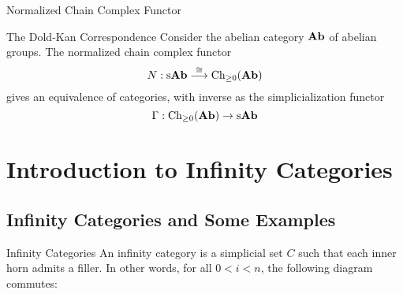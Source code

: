 \documentclass[a4paper]{article}
\begin{document}
\begin{defn}{Normalized Chain Complex Functor}{} 
\end{defn}

\begin{thm}{The Dold-Kan Correspondence}{} Consider the abelian category $\bold{Ab}$ of abelian groups. The normalized chain complex functor $$N:\text{s}\bold{Ab}\overset{\cong}{\longrightarrow}\text{Ch}_{\geq 0}(\bold{Ab})$$ gives an equivalence of categories, with inverse as the simplicialization functor $$\Gamma:\text{Ch}_{\geq 0}(\bold{Ab})\to\text{s}\bold{Ab}$$
\end{thm}

\pagebreak
\section{Introduction to Infinity Categories}
\subsection{Infinity Categories and Some Examples}
\begin{defn}{Infinity Categories}{} An infinity category is a simplicial set $C$ such that each inner horn admits a filler. In other words, for all $0<i<n$, the following diagram commutes: \\~\\
\\~\\
\end{defn}
\end{document}
